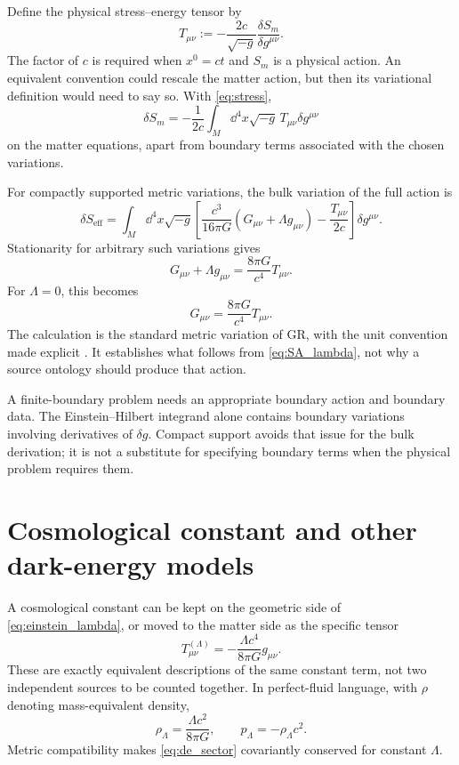 \documentclass[11pt]{article}
\begin{document}
Define the physical stress--energy tensor by
\begin{equation}
T_{\mu\nu}:=-\frac{2c}{\sqrt{-g}}
\frac{\delta S_m}{\delta g^{\mu\nu}}.
\label{eq:stress}
\end{equation}
The factor of $c$ is required when $x^0=ct$ and $S_m$ is a physical action. An equivalent convention could rescale the matter action, but then its variational definition would need to say so. With \eqref{eq:stress},
\begin{equation}
\delta S_m=-\frac{1}{2c}\int_M\dd^4x\sqrt{-g}\,
T_{\mu\nu}\delta g^{\mu\nu}
\end{equation}
on the matter equations, apart from boundary terms associated with the chosen variations.

For compactly supported metric variations, the bulk variation of the full action is
\begin{equation}
\delta S_{\mathrm{eff}}=
\int_M\dd^4x\sqrt{-g}\left[
\frac{c^3}{16\pi G}(G_{\mu\nu}+\Lambda g_{\mu\nu})-
\frac{T_{\mu\nu}}{2c}\right]\delta g^{\mu\nu}.
\end{equation}
Stationarity for arbitrary such variations gives
\begin{equation}
\boxed{G_{\mu\nu}+\Lambda g_{\mu\nu}=\frac{8\pi G}{c^4}T_{\mu\nu}.}
\label{eq:einstein_lambda}
\end{equation}
For $\Lambda=0$, this becomes
\begin{equation}
G_{\mu\nu}=\frac{8\pi G}{c^4}T_{\mu\nu}.
\label{eq:einstein}
\end{equation}
The calculation is the standard metric variation of GR, with the unit convention made explicit \parencite{Carroll1997}. It establishes what follows from \eqref{eq:SA_lambda}, not why a source ontology should produce that action.

A finite-boundary problem needs an appropriate boundary action and boundary data. The Einstein--Hilbert integrand alone contains boundary variations involving derivatives of $\delta g$. Compact support avoids that issue for the bulk derivation; it is not a substitute for specifying boundary terms when the physical problem requires them.

\section{Cosmological constant and other dark-energy models}
A cosmological constant can be kept on the geometric side of \eqref{eq:einstein_lambda}, or moved to the matter side as the specific tensor
\begin{equation}
T^{(\Lambda)}_{\mu\nu}=-\frac{\Lambda c^4}{8\pi G}g_{\mu\nu}.
\label{eq:de_sector}
\end{equation}
These are exactly equivalent descriptions of the same constant term, not two independent sources to be counted together. In perfect-fluid language, with $\rho$ denoting mass-equivalent density,
\begin{equation}
\rho_\Lambda=\frac{\Lambda c^2}{8\pi G},\qquad
p_\Lambda=-\rho_\Lambda c^2.
\end{equation}
Metric compatibility makes \eqref{eq:de_sector} covariantly conserved for constant $\Lambda$.
\end{document}
